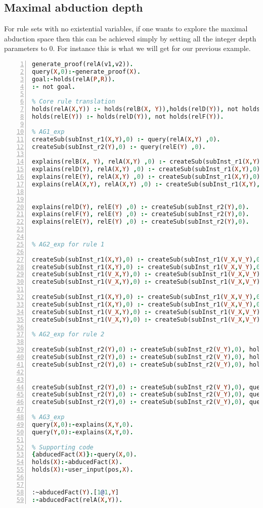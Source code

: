 \documentclass{article}
\begin{document}
\subsection{Maximal abduction depth}
For rule sets with no existential variables, if one wants to explore the maximal abduction space then this can be achieved simply by setting all the integer depth parameters to 0. For instance this is what we will get for our previous example.
\begin{lstlisting}[language=Prolog, numbers=left]
% Encoding the goal
generate_proof(relA(v1,v2)).
query(X,0):-generate_proof(X).
goal:-holds(relA(P,R)).
:- not goal.

% Core rule translation
holds(relA(X,Y)) :- holds(relB(X, Y)),holds(relD(Y)), not holds(relE(Y)).
holds(relE(Y)) :- holds(relD(Y)), not holds(relF(Y)).

% AG1_exp
createSub(subInst_r1(X,Y),0) :- query(relA(X,Y) ,0).
createSub(subInst_r2(Y),0) :- query(relE(Y) ,0).

explains(relB(X, Y), relA(X,Y) ,0) :- createSub(subInst_r1(X,Y),0).
explains(relD(Y), relA(X,Y) ,0) :- createSub(subInst_r1(X,Y),0).
explains(relE(Y), relA(X,Y) ,0) :- createSub(subInst_r1(X,Y),0).
explains(relA(X,Y), relA(X,Y) ,0) :- createSub(subInst_r1(X,Y),0).


explains(relD(Y), relE(Y) ,0) :- createSub(subInst_r2(Y),0).
explains(relF(Y), relE(Y) ,0) :- createSub(subInst_r2(Y),0).
explains(relE(Y), relE(Y) ,0) :- createSub(subInst_r2(Y),0).


% AG2_exp for rule 1

createSub(subInst_r1(X,Y),0) :- createSub(subInst_r1(V_X,V_Y),0), holds(relA(X,Y)).
createSub(subInst_r1(X,Y),0) :- createSub(subInst_r1(V_X,V_Y),0), holds(relB(X,Y)).
createSub(subInst_r1(V_X,Y),0) :- createSub(subInst_r1(V_X,V_Y),0), holds(relD(Y)).
createSub(subInst_r1(V_X,Y),0) :- createSub(subInst_r1(V_X,V_Y),0), holds(relE(Y)).

createSub(subInst_r1(X,Y),0) :- createSub(subInst_r1(V_X,V_Y),0), query(relA(X,Y),0).
createSub(subInst_r1(X,Y),0) :- createSub(subInst_r1(V_X,V_Y),0), query(relB(X,Y),0).
createSub(subInst_r1(V_X,Y),0) :- createSub(subInst_r1(V_X,V_Y),0), query(relD(Y),0).
createSub(subInst_r1(V_X,Y),0) :- createSub(subInst_r1(V_X,V_Y),0), query(relF(Y),0).

% AG2_exp for rule 2

createSub(subInst_r2(Y),0) :- createSub(subInst_r2(V_Y),0), holds(relE(Y)).
createSub(subInst_r2(Y),0) :- createSub(subInst_r2(V_Y),0), holds(relD(Y)).
createSub(subInst_r2(Y),0) :- createSub(subInst_r2(V_Y),0), holds(relF(Y)).


createSub(subInst_r2(Y),0) :- createSub(subInst_r2(V_Y),0), query(relE(Y),0).
createSub(subInst_r2(Y),0) :- createSub(subInst_r2(V_Y),0), query(relD(Y),0).
createSub(subInst_r2(Y),0) :- createSub(subInst_r2(V_Y),0), query(relF(Y),0).

% AG3_exp
query(X,0):-explains(X,Y,0).
query(Y,0):-explains(X,Y,0).

% Supporting code
{abducedFact(X)}:-query(X,0).
holds(X):-abducedFact(X).
holds(X):-user_input(pos,X).


:~abducedFact(Y).[1@1,Y]
:-abducedFact(relA(X,Y)).
\end{lstlisting}
\end{document}
